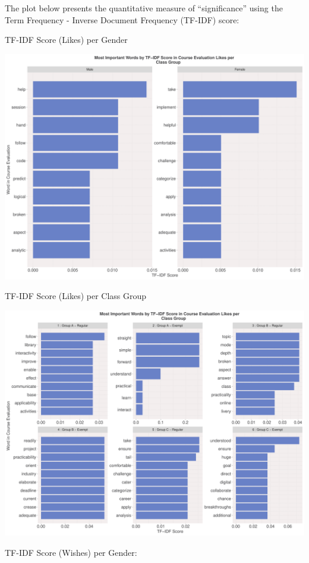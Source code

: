 \documentclass[
]{article}
\begin{document}
The plot below presents the quantitative measure of ``significance''
using the Term Frequency - Inverse Document Frequency (TF-IDF) score:

TF-IDF Score (Likes) per Gender

\includegraphics{AnalysisOfCourseEvaluation-Notebook_files/figure-latex/TF-IDFLikesPerGender-1.pdf}

\newpage

TF-IDF Score (Likes) per Class Group

\includegraphics{AnalysisOfCourseEvaluation-Notebook_files/figure-latex/TF-IDFLikesPerGroup-1.pdf}

\newpage

TF-IDF Score (Wishes) per Gender:
\end{document}
